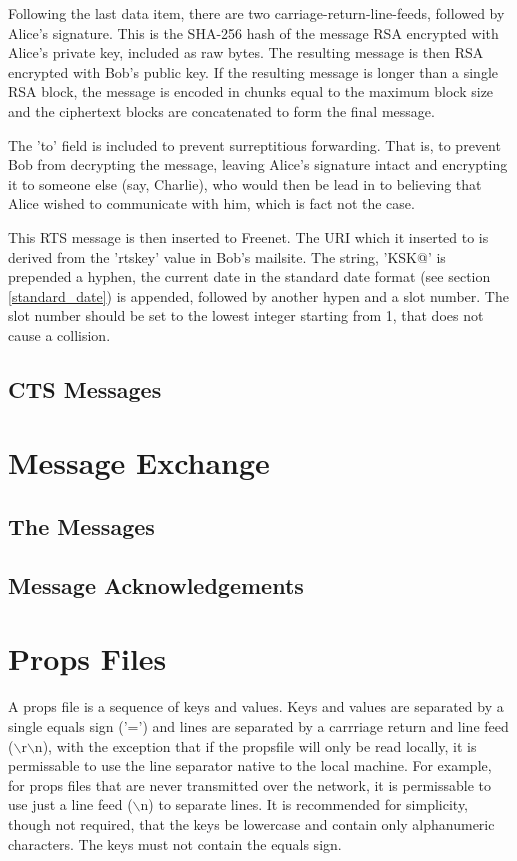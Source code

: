 \documentclass[12pt,a4paper]{article}
\begin{document}
Following the last data item, there are two carriage-return-line-feeds, followed by Alice's signature. This is the SHA-256 hash of the message RSA encrypted with Alice's private key, included as raw bytes. The resulting message is then RSA encrypted with Bob's public key. If the resulting message is longer than a single RSA block, the message is encoded in chunks equal to the maximum block size and the ciphertext blocks are concatenated to form the final message.

The 'to' field is included to prevent surreptitious forwarding. That is, to prevent Bob from decrypting the message, leaving Alice's signature intact and encrypting it to someone else (say, Charlie), who would then be lead in to believing that Alice wished to communicate with him, which is fact not the case.

This RTS message is then inserted to Freenet. The URI which it inserted to is derived from the 'rtskey' value in Bob's mailsite. The string, 'KSK@' is prepended a hyphen, the current date in the standard date format (see section \ref{standard_date}) is appended, followed by another hypen and a slot number. The slot number should be set to the lowest integer starting from 1, that does not cause a collision.

\subsection{CTS Messages}

\section{Message Exchange}
\subsection{The Messages}

\subsection{Message Acknowledgements}

\appendix

\section{Props Files}
\label{PropsFile}
A props file is a sequence of keys and values. Keys and values are separated by a single equals sign ('=') and lines are separated by a carrriage return and line feed ($\backslash$r$\backslash$n), with the exception that if the propsfile will only be read locally, it is permissable to use the line separator native to the local machine. For example, for props files that are never transmitted over the network, it is permissable to use just a line feed ($\backslash$n) to separate lines. It is recommended for simplicity, though not required, that the keys be lowercase and contain only alphanumeric characters. The keys must not contain the equals sign.
\end{document}
